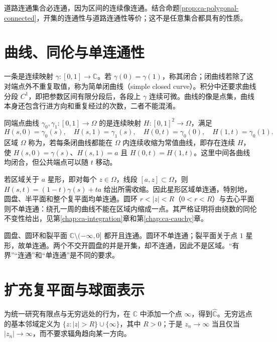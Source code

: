 \documentclass[UTF8,12pt,a4paper,fontset=fandol]{ctexbook}
\begin{document}
道路连通集合必连通，因为区间的连续像连通。结合命题\ref{prop:ca-polygonal-connected}，开集的连通性与道路连通性等价；这不是任意集合都具有的性质。

\section{曲线、同伦与单连通性}

一条是连续映射 $\gamma:[0,1]\to\mathbb{C}$。若 $\gamma(0)=\gamma(1)$，称其闭合；闭曲线若除了这对端点外不重复取值，称为简单闭曲线（simple closed curve）。积分中还要求曲线分段 $C^1$，即把参数区间有限分段后，各段上 $\gamma$ 连续可微。曲线的像是点集，曲线本身还包含行进方向和重复经过的次数，二者不能混淆。

\begin{definition}[同伦与单连通]
同端点曲线 $\gamma_0,\gamma_1:[0,1]\to\Omega$ 的是连续映射 $H:[0,1]^2\to\Omega$，满足
\[
 H(s,0)=\gamma_0(s),\quad H(s,1)=\gamma_1(s),\quad
 H(0,t)=\gamma_0(0),\quad H(1,t)=\gamma_0(1).
\]
区域 $\Omega$ 称为，若每条闭曲线都能在 $\Omega$ 内连续收缩为常值曲线，即存在连续 $H$，使 $H(s,0)=\gamma(s)$、$H(s,1)=a$ 且 $H(0,t)=H(1,t)$。这里中间各曲线均闭合，但公共端点可以随 $t$ 移动。
\end{definition}

若区域关于 $a$ 星形，即对每个 $z\in\Omega$，线段 $[a,z]\subset\Omega$，则 $H(s,t)=(1-t)\gamma(s)+ta$ 给出所需收缩。因此星形区域单连通，特别地，圆盘、半平面和整个复平面均单连通。圆环 $r<|z|<R$（$0<r<R$）与去心平面则不单连通：绕孔一周的曲线不能在区域内缩成一点。其严格证明将由绕数的同伦不变性给出，见第\ref{chap:ca-integration}章和第\ref{chap:ca-cauchy}章。

\begin{example}[几个典型区域]
圆盘、圆环和裂平面 $\mathbb{C}\setminus(-\infty,0]$ 都开且连通。圆环不单连通；裂平面关于点 $1$ 星形，故单连通。两个不交开圆盘的并是开集，却不连通，因此不是区域。“有界”“连通”和“单连通”是不同的要求。
\end{example}

\section{扩充复平面与球面表示}

为统一研究有限点与无穷远处的行为，在 $\mathbb{C}$ 中添加一个点 $\infty$，得到$\widehat{\mathbb{C}}$。无穷远点的基本邻域定义为 $\{z:|z|>R\}\cup\{\infty\}$，其中 $R>0$；于是 $z_n\to\infty$ 当且仅当 $|z_n|\to\infty$，而不要求辐角趋向某一方向。
\end{document}
